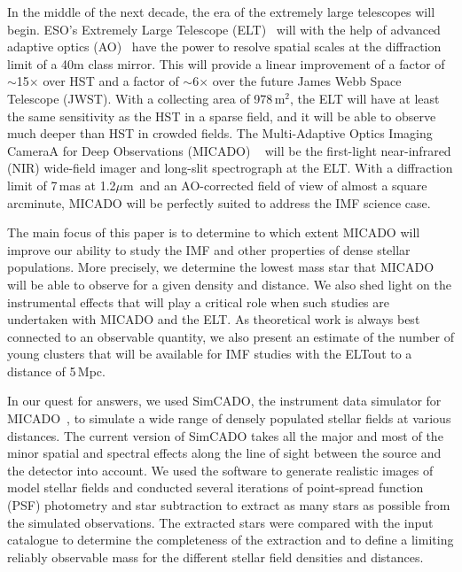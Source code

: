 \documentclass{aa}
\newcommand{\um}{$\mu$m~}
\newcommand{\s}{$\sim$}
\newcommand{\h}[1]{$^{#1}$}
\begin{document}
In the middle of the next decade, the era of the extremely large telescopes will begin.
ESO's Extremely Large Telescope (ELT)~\citep{eelt} will with the help of advanced adaptive optics (AO)~\citep{maory} have the power to resolve spatial scales at the diffraction limit of a 40m class mirror.
This will provide a linear improvement of a factor of \s15$\times$ over HST and a factor of \s6$\times$ over the future James Webb Space Telescope (JWST).
With a collecting area of 978\,m\h2, the ELT will have at least the same sensitivity as the HST in a sparse field, and it will be able to observe much deeper than HST in crowded fields.
The Multi-Adaptive Optics Imaging CameraA for Deep Observations (MICADO) ~\citep{micado2016, micado2018} will be the first-light near-infrared (NIR) wide-field imager and long-slit spectrograph at the ELT\@.
With a diffraction limit of 7\,mas at 1.2\um and an AO-corrected field of view of almost a square arcminute, MICADO will be perfectly suited to address the IMF science case.

The main focus of this paper is to determine to which extent MICADO will improve our ability to study the IMF and other properties of dense stellar populations.
More precisely, we determine the lowest mass star that MICADO will be able to observe for a given density and distance.
We also shed light on the instrumental effects that will play a critical role when such studies are undertaken with MICADO and the ELT.
As theoretical work is always best connected to an observable quantity, we also present an estimate of the number of young clusters that will be available for IMF studies with the ELT\@ out to a distance of 5\,Mpc.

In our quest for answers, we used SimCADO, the instrument data simulator for MICADO~\citep{leschinski2016, leschinski19}, to simulate a wide range of densely populated stellar fields at various distances.
The current version of SimCADO takes all the major and most of the minor spatial and spectral effects along the line of sight between the source and the detector into account.
We used the software to generate realistic images of model stellar fields and  conducted several iterations of point-spread function (PSF) photometry and star subtraction to extract as many stars as possible from the simulated observations.
The extracted stars were compared with the input catalogue to determine the completeness of the extraction and to define a limiting reliably observable mass for the different stellar field densities and distances.
\end{document}
